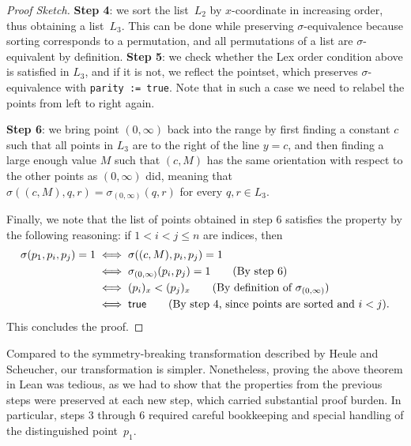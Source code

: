 \begin{proof}[Proof Sketch]
\textbf{Step 4}: we sort the list~$L_2$ by $x$-coordinate in increasing order,
thus obtaining a list~$L_3$.
This can be done while preserving $\sigma$-equivalence because sorting corresponds to a permutation,
and all permutations of a list are $\sigma$-equivalent by definition.
\textbf{Step 5}: we check whether the \textsf{Lex order} condition above is satisfied in $L_3$,
and if it is not, we reflect the pointset,
which preserves $\sigma$-equivalence with \lstinline|parity := true|.
Note that in such a case we need to relabel the points from left to right again.

\textbf{Step 6}: we bring point $(0, \infty)$ back into the range
by first finding a constant $c$ such that all points in $L_3$ are to the right of the line $y=c$,
and then finding a large enough value $M$ such that $(c, M)$ has the same orientation
with respect to the other points as $(0, \infty)$ did,
meaning that 
\(\sigma((c, M), q, r) = \sigma_{(0, \infty)}(q, r)\) for every $q, r \in L_3$.

Finally, we note that the list of points obtained in step 6
satisfies the  property by the following reasoning:
if $1 < i < j \leq n$ are indices, then 
\begin{align*}
  \sigma(p_1, p_i, p_j) = 1 &\iff \sigma((c, M), p_i, p_j) = 1\\
                            &\iff \sigma_{(0, \infty)}(p_i, p_j) = 1\tag{By step 6}\\
                            &\iff (p_i)_x < (p_j)_x \tag{By definition of $\sigma_{(0, \infty)}$}\\
                            &\iff \textsf{true} \tag{By step 4, since points are sorted and $i < j$}.
\end{align*}
This concludes the proof.
\end{proof}

Compared to the symmetry-breaking transformation described by Heule and Scheucher,
our transformation is simpler.
Nonetheless, proving the above theorem in Lean was tedious,
as we had to show that the properties from the previous steps were preserved at each new step,
which carried substantial proof burden.
In particular, steps 3 through 6 required careful bookkeeping and special handling of the distinguished point~$p_1$.
